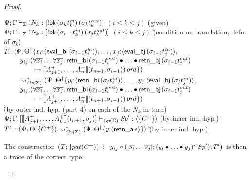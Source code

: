 \begin{proof}
\begin{itemize}
  \begin{tabbing}
  ${\Psi}; {\Gamma} \vdash_{\Sigma} {{!}{N_k}} : {[{!}{{\sf bk}\,({\sigma_k}t_k^{\it in})\,({\sigma_k}t_k^{\it out})}]}$ \quad $(i \leq k \leq j)$
  \` (given) 
  \\
  ${\Psi}; {\Gamma} \vdash_{\Sigma} {{!}{N_k}} : {[{!}{{\sf bk}\,({\sigma_{i-1}}t_k^{\it in})\,({\sigma_j}t_k^{\it out})}]}$ \quad $(i \leq k \leq j)$
  \` (condition on translation, defn. of $\sigma_k$)
  \\
  $T :: (\Psi$\=$, {{\Theta}^\dag} \{
        x_i{:}\langle {{\sf eval\_bi}\,({\sigma_{i-1}}t^{\it in}_i)} \rangle, \ldots,
    x_j{:}\langle {{\sf eval\_bj}\,({\sigma_{i-1}}t^{\it in}_j)} \rangle,$\\
  \>$~ \qquad y_{ij}{:}(\forall\overline{x_i}\ldots\forall\overline{x_j}.\, 
     {\sf retn\_bi}\,(\sigma_{i-1}{t^{\it out}_i})
     \mathbin{\bullet} \ldots \mathbin{\bullet} 
     {\sf retn\_bj}\,(\sigma_{i-1}{t^{\it out}_j})$\\
  \>$~ \qquad\qquad
      \rightarrowtail \llbracket {A^+_{j+1},\ldots,A^+_n} \rrbracket({t_{n+1}},{\sigma_{i-1}}))\,{\it ord}
       \})$\\
  $~ \qquad \leadsto^*_{{\it Op}({\Sigma})} 
        (\Psi$\=$, {{\Theta}^\dag} \{
        y_i{:}\langle {{\sf retn\_bi}\,({\sigma_{j}}t^{\it in}_i)} \rangle, \ldots,
    y_j{:}\langle {{\sf eval\_bj}\,({\sigma_{j}}t^{\it in}_j)} \rangle,$\\
  \>$~ \qquad y_{ij}{:}(\forall\overline{x_i}\ldots\forall\overline{x_j}.\, 
     {\sf retn\_bi}\,(\sigma_{i-1}{t^{\it out}_i})
     \mathbin{\bullet} \ldots \mathbin{\bullet} 
     {\sf retn\_bj}\,(\sigma_{i-1}{t^{\it out}_j})$\\
  \>$~ \qquad\qquad
      \rightarrowtail \llbracket {A^+_{j+1},\ldots,A^+_n} \rrbracket({t_{n+1}},{\sigma_{i-1}}))\,{\it ord}
       \})$\\
  \` (by outer ind. hyp. (part 4) on each of the $N_k$ in turn)
  \\
  ${\Psi}; {\Gamma,[\llbracket {A^+_{j+1},\ldots,A^+_n} \rrbracket({t_{n+1}},{\sigma_{j}})]} \vdash_{{\it Op}({\Sigma})} {{\it Sp}'} : {\langle {\{ C^+ \}} \rangle}$  \` (by inner ind. hyp.)
  \\
  $T' :: (\Psi, {{{\Theta}^\dag}}\{{C^+}\}) \leadsto^*_{{\it Op}({\Sigma})}
        (\Psi, {{{\Theta}^\dag}}\{{y{:}\langle {{\sf retn\_a}\,s} \rangle}\})$ 
   \` (by inner ind. hyp.)
  \end{tabbing}

  The construction 
  $\left(T; \{{{\it pat}({C^+})}\} \leftarrow {y_{ij}} \circ {([{\overline{s_i}\ldots\overline{s_j}}]; {{({y_i} \mathbin{\bullet}{{\ldots} \mathbin{\bullet}{y_j}})}{^{<}}{{\it Sp}'}})}; T'\right) $
  is then a trace of the correct type.
  \bigskip


\end{itemize}
\end{proof}
